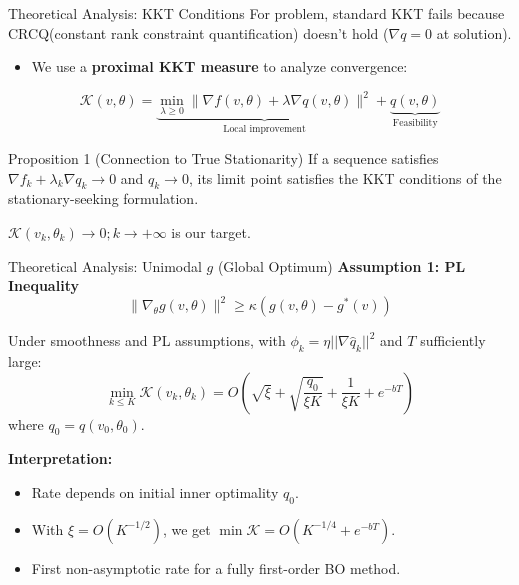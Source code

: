 \documentclass{beamer}
\begin{document}
\begin{frame}{Theoretical Analysis: KKT Conditions}
    For problem, standard KKT fails because CRCQ(constant rank constraint quantification) doesn't hold ($\nabla q=0$ at solution).
    \begin{itemize}
        \item We use a \textbf{proximal KKT measure} to analyze convergence:
    \end{itemize}
    \begin{equation*}
        \mathcal{K}(v,\theta) = \underbrace{\min_{\lambda \geq 0} \| \nabla f(v,\theta) + \lambda \nabla q(v,\theta) \|^2}_{\text{Local improvement}} + \underbrace{q(v,\theta)}_{\text{Feasibility}}
    \end{equation*}
    \begin{block}{Proposition 1 (Connection to True Stationarity)}
        If a sequence satisfies $\nabla f_k + \lambda_k \nabla q_k \rightarrow 0$ and $q_k \rightarrow 0$, its limit point satisfies the KKT conditions of the stationary-seeking formulation.
    \end{block}
    $\mathcal{K}(v_k,\theta_k) \rightarrow 0; k \rightarrow +\infty$ is our target.
\end{frame}

\begin{frame}{Theoretical Analysis: Unimodal $g$ (Global Optimum)}
    \textbf{Assumption 1: PL Inequality}
    \begin{equation*}
        \| \nabla_\theta g(v,\theta) \|^2 \geq \kappa (g(v,\theta) - g^*(v))
    \end{equation*}
    \begin{theorem}
        Under smoothness and PL assumptions, with $\phi_k = \eta ||\nabla \hat{q}_k||^2$ and $T$ sufficiently large:
        \begin{equation*}
            \min_{k\leq K} \mathcal{K}(v_k,\theta_k) = O\left( \sqrt{\xi} + \sqrt{\frac{q_0}{\xi K}} + \frac{1}{\xi K} + e^{-bT} \right)
        \end{equation*}
        where $q_0 = q(v_0,\theta_0)$.
    \end{theorem}
    \textbf{Interpretation:}
    \begin{itemize}
        \item Rate depends on initial inner optimality $q_0$.
        \item With $\xi = O(K^{-1/2})$, we get $\min \mathcal{K} = O(K^{-1/4} + e^{-bT})$.
        \item First non-asymptotic rate for a fully first-order BO method.
    \end{itemize}
\end{frame}
\end{document}
